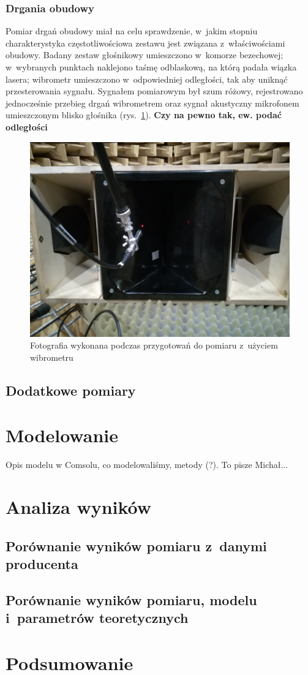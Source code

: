 \documentclass[12pt]{oska}
\begin{document}
			
		\subsubsection{Drgania obudowy}
			
			Pomiar drgań obudowy miał na celu sprawdzenie, w~jakim stopniu charakterystyka częstotliwościowa zestawu jest związana z~właściwościami obudowy. Badany zestaw głośnikowy umieszczono w~komorze bezechowej; w~wybranych punktach naklejono taśmę odblaskową, na którą padała wiązka lasera; wibrometr umieszczono w~odpowiedniej odległości, tak aby uniknąć przesterowania sygnału. Sygnałem pomiarowym był szum różowy, rejestrowano jednocześnie przebieg drgań wibrometrem oraz sygnał akustyczny mikrofonem umieszczonym blisko głośnika (rys.~\ref{r:zdjecie_wibro}). \color{red} \textbf{Czy na pewno tak, ew. podać odległości} \color{black}
			
			\begin{figure}[!h]
				\centering
				\includegraphics[width=.8\textwidth]{zdjecie_wibro.jpg}
				\caption{Fotografia wykonana podczas przygotowań do pomiaru z~użyciem wibrometru}
				\label{r:zdjecie_wibro}
			\end{figure}

	
	\subsection{Dodatkowe pomiary}\label{ss:dodatkowe}

\section{Modelowanie}

	\color{orange} Opis modelu w Comsolu, co modelowaliśmy, metody (?). To pisze Michał...
	\color{black}

\section{Analiza wyników}

	\subsection{Porównanie wyników pomiaru z~danymi producenta}
	
	\subsection{Porównanie wyników pomiaru, modelu i~parametrów teoretycznych}

\section{Podsumowanie}

\printbibliography
\end{document}
